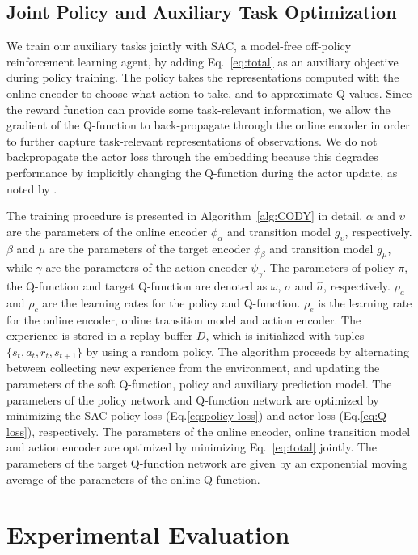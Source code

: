 \documentclass[a4paper,12pt]{article}
\begin{document}
\subsection{Joint Policy and Auxiliary Task Optimization}

We train our auxiliary tasks jointly with SAC, a model-free off-policy reinforcement learning agent, by adding Eq.~\ref{eq:total} as an auxiliary objective during policy training. The policy takes the representations computed with the online encoder to choose what action to take, and to approximate Q-values. Since the reward function can provide some task-relevant information, we allow the gradient of the Q-function to back-propagate through the online encoder in order to further capture task-relevant representations of observations. We do not backpropagate the actor loss through the embedding because this degrades performance by implicitly changing the Q-function during the actor update, as noted by \citet{yarats2019improving}.

The training procedure is presented in Algorithm~\ref{alg:CODY} in detail. $\alpha$ and $\upsilon$ are the parameters of the online encoder $\phi_\alpha$ and transition model $g_\upsilon$, respectively. $\beta$ and $\mu$ are the parameters of the target encoder $\phi_\beta$ and transition model $g_\mu$, while $\gamma$ are the parameters of the action encoder $\psi_\gamma$. The parameters of policy $\pi$, the Q-function and target Q-function are denoted as $\omega$, $\sigma$ and $\hat \sigma$, respectively. $\rho_a$ and $\rho_c$ are the learning rates for the policy and Q-function. $\rho_e$ is the learning rate for the online encoder, online transition model and action encoder. The experience is stored in a replay buffer $D$, which is initialized with tuples $\{s_t, a_t, r_t, s_{t+1}\}$ by using a random policy. The algorithm proceeds by alternating between collecting new experience from the environment, and updating the parameters of the soft Q-function, policy and auxiliary prediction model. The parameters of the policy network and Q-function network are optimized by minimizing the SAC policy loss (Eq.\ref{eq:policy loss}) and actor loss (Eq.\ref{eq:Q loss}), respectively. The parameters of the online encoder, online transition model and action encoder are optimized by minimizing Eq.~\ref{eq:total} jointly. The parameters of the target Q-function network are given by an exponential moving average of the parameters of the online Q-function. 

\section{Experimental Evaluation}
\label{sec:Experiment}
\end{document}
